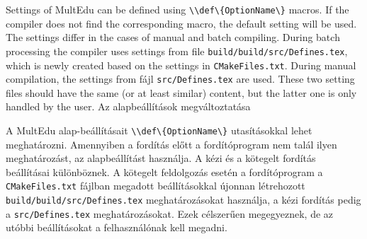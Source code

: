 
{
Settings of \gls{MultEdu} can be defined using \lstinline|\\def\{OptionName\}| macros.
If the compiler does not find the corresponding macro, the default setting will be used.
The settings differ in the cases of manual and batch compiling.
During batch processing the compiler uses settings from file
\lstinline|build/build/src/Defines.tex|, which is newly created based on
the settings in \lstinline|CMakeFiles.txt|.
During manual compilation, the settings from fájl \lstinline|src/Defines.tex|
are used. These two setting files should have the same (or at least similar) content,
but the latter one is only handled by the user.
}
{Az alapbeállítások megváltoztatása}
{
A \gls{MultEdu} alap-beállításait \lstinline|\\def\{OptionName\}| utasításokkal
lehet meghatározni. Amennyiben a fordítás előtt a fordítóprogram nem talál
ilyen meghatározást, az alapbeállítást használja.
A kézi és a kötegelt fordítás beállításai különböznek. A kötegelt feldolgozás
esetén a fordítóprogram a \lstinline|CMakeFiles.txt| fájlban megadott
beállításokkal újonnan létrehozott \lstinline|build/build/src/Defines.tex|
meghatározásokat használja, a kézi fordítás pedig a \lstinline|src/Defines.tex|
meghatározásokat. Ezek célszerűen megegyeznek, de az utóbbi beállításokat 
a felhasználónak kell megadni.

}



